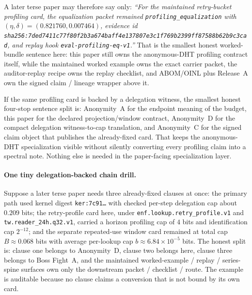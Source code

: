 \documentclass[11pt]{article}
\begin{document}
A later terse paper may therefore say only: \emph{``For the maintained retry-bucket profiling card, the equalization packet remained \nolinkurl{profiling\_equalization} with $(\eta,\delta)=(0.821760,0.007464)$, evidence id \nolinkurl{sha256:7ded7411c77f80f2b3a674baff4e137807e3c1f769b2399ff87588b62b9c3cad}, and replay hook \nolinkurl{eval-profiling-eq-v1}.''}
That is the smallest honest worked-bundle sentence here: this paper still owns the anonymous-DHT profiling contract itself, while the maintained worked example owns the exact carrier packet, the auditor-replay recipe owns the replay checklist, and ABOM/OINL plus Release~A own the signed claim / lineage wrapper above it.\cite{series:workedexample,series:replayrecipe,series:abomoinl,series:releaseA}

If the same profiling card is backed by a delegation witness, the smallest honest four-stop sentence split is: Anonymity~A for the endpoint meaning of the budget, this paper for the declared projection/window contract, Anonymity~D for the compact delegation witness-to-cap translation, and Anonymity~C for the signed claim object that publishes the already-fixed card. That keeps the anonymous-DHT specialization visible without silently converting every profiling claim into a spectral note.\cite{series:oddsinflation,series:spectral2budget,series:abomoinl}
Nothing else is needed in the paper-facing specialization layer.

\paragraph{One tiny delegation-backed chain drill.}
Suppose a later terse paper needs three already-fixed clauses at once: the primary path used kernel digest \texttt{ker:7c91\ldots} with checked per-step delegation cap about $0.209$ bits; the retry-profile card here, under \texttt{enf.lookup.retry\_profile.v1} and \texttt{tw.reader\_24h.q32.v1}, carried a horizon profiling cap of $4$ bits and identification cap $2^{-12}$; and the separate repeated-use window card remained at total cap $B\approx 0.068$ bits with average per-lookup cap $b\approx 6.84\times 10^{-5}$ bits. The honest split is: clause one belongs to Anonymity~D, clause two belongs here, clause three belongs to Boss Fight~A, and the maintained worked-example / replay / series-spine surfaces own only the downstream packet / checklist / route. The example is auditable because no clause claims a conversion that is not bound by its own card.\cite{series:spectral2budget,series:bossfightA,series:workedexample,series:replayrecipe,series:seriesspines}
\end{document}
